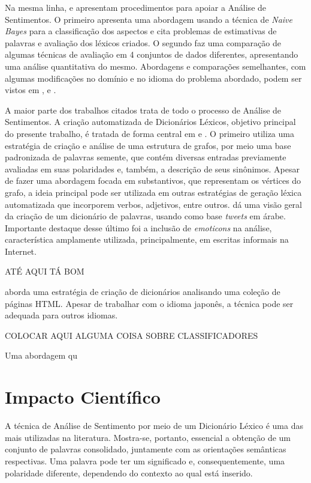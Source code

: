 \documentclass[a4paper,11pt]{article}
\begin{document}
Na mesma linha, \cite{eisenstein2016unsupervised} e \cite{bandhakavi2016lexicon} apresentam procedimentos para apoiar a Análise de Sentimentos. O primeiro apresenta uma abordagem usando a técnica de \emph{Naive Bayes} para a classificação dos aspectos e cita problemas de estimativas de palavras e avaliação dos léxicos criados. O segundo faz uma comparação de algumas técnicas de avaliação em 4 conjuntos de dados diferentes, apresentando uma análise quantitativa do mesmo. Abordagens e comparações semelhantes, com algumas modificações no domínio e no idioma do problema abordado, podem ser vistos em \cite{khoo2017lexicon}, \cite{asghar2014review} e \cite{ding2008holistic}.

A maior parte dos trabalhos citados trata de todo o processo de Análise de Sentimentos. A criação automatizada de Dicionários Léxicos, objetivo principal do presente trabalho, é tratada de forma central em \cite{widdows2002graph} e \cite{duwairi2015detecting}. O primeiro utiliza uma estratégia de criação e análise de uma estrutura de grafos, por meio uma base padronizada de palavras semente, que contém diversas entradas previamente avaliadas em suas polaridades e, também, a descrição de seus sinônimos. Apesar de fazer uma abordagem focada em substantivos, que representam os vértices do grafo, a ideia principal pode ser utilizada em outras estratégias de geração léxica automatizada que incorporem verbos, adjetivos, entre outros. \cite{duwairi2015detecting} dá uma visão geral da criação de um dicionário de palavras, usando como base \emph{tweets} em árabe. Importante destaque desse último foi a inclusão de \emph{emoticons} na análise, característica amplamente utilizada, principalmente, em escritas informais na Internet.

ATÉ AQUI TÁ BOM


\cite{kaji} aborda uma estratégia de criação de dicionários analisando uma coleção de páginas HTML. Apesar de trabalhar com o idioma japonês, a técnica pode ser adequada para outros idiomas.

COLOCAR AQUI ALGUMA COISA SOBRE CLASSIFICADORES
	
Uma abordagem qu

\section{Impacto Científico}
\label{sec:impact}
A técnica de Análise de Sentimento por meio de um Dicionário Léxico é uma das mais utilizadas na literatura. Mostra-se, portanto, essencial a obtenção de um conjunto de palavras consolidado, juntamente com as orientações semânticas respectivas. 
Uma palavra pode ter um significado e, consequentemente, uma polaridade diferente, dependendo do contexto ao qual está inserido. 
\end{document}

